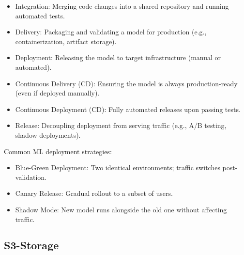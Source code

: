 \begin{itemize}
    \item Integration: Merging code changes into a shared repository and running automated tests.
    \item Delivery: Packaging and validating a model for production (e.g., containerization, artifact storage).
    \item Deployment: Releasing the model to target infrastructure (manual or automated).
    \item Continuous Delivery (CD): Ensuring the model is always production-ready (even if deployed manually).
    \item Continuous Deployment (CD): Fully automated releases upon passing tests.
    \item Release: Decoupling deployment from serving traffic (e.g., A/B testing, shadow deployments).
\end{itemize}
Common ML deployment strategies:
\begin{itemize}
    \item Blue-Green Deployment: Two identical environments; traffic switches post-validation.
    \item Canary Release: Gradual rollout to a subset of users.
    \item Shadow Mode: New model runs alongside the old one without affecting traffic.
\end{itemize}

\subsection{S3-Storage}
